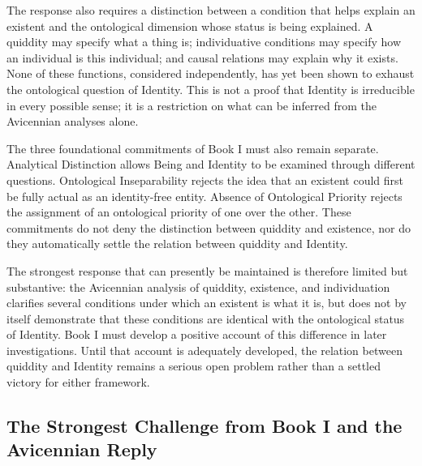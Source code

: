 \label{para:VS.B01.P01.C08.S13.SS15.P004}

The response
also requires
a distinction
between a
condition that
helps explain
an existent
and the
ontological
dimension whose
status is
being explained.
A quiddity
may specify
what a
thing is;
individuative
conditions may
specify how
an individual
is this
individual; and
causal relations
may explain
why it
exists. None
of these
functions,
considered
independently,
has yet
been shown
to exhaust
the ontological
question of
Identity. This
is not
a proof
that Identity
is irreducible
in every
possible sense;
it is
a restriction
on what
can be
inferred from
the Avicennian
analyses alone.

\label{para:VS.B01.P01.C08.S13.SS15.P005}

The three
foundational commitments
of Book I
must also
remain separate.
Analytical Distinction
allows Being
and Identity
to be
examined through
different questions.
Ontological Inseparability
rejects the
idea that
an existent
could first
be fully
actual as
an identity-free
entity. Absence
of Ontological
Priority rejects
the assignment
of an
ontological
priority of
one over
the other.
These commitments
do not
deny the
distinction between
quiddity and
existence, nor
do they
automatically settle
the relation
between quiddity
and Identity.

\label{para:VS.B01.P01.C08.S13.SS15.P006}

The strongest
response that
can presently
be maintained
is therefore
limited but
substantive: the
Avicennian analysis
of quiddity,
existence,
and individuation
clarifies several
conditions under
which an
existent is
what it
is, but
does not
by itself
demonstrate that
these conditions
are identical
with the
ontological status
of Identity.
Book I
must develop
a positive
account of
this difference
in later
investigations.
Until that
account is
adequately developed,
the relation
between quiddity
and Identity
remains a
serious open
problem rather
than a
settled victory
for either
framework.



\subsection{The Strongest Challenge from Book I and the Avicennian Reply}
\label{subsec:ch08-avicenna-book1-challenge}

